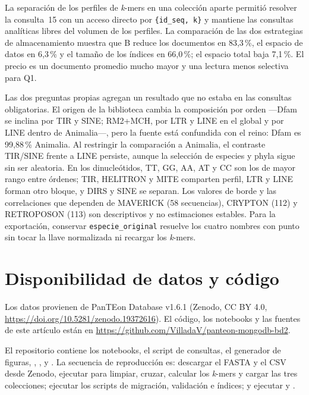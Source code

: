 \documentclass[journal]{IEEEtran}
\begin{document}
La separación de los perfiles de \textit{k}-mers en una colección aparte permitió resolver
la consulta~15 con un acceso directo por \texttt{\{id\_seq, k\}} y mantiene las consultas
analíticas libres del volumen de los perfiles. La comparación de las dos estrategias de
almacenamiento muestra que B reduce los documentos en 83,3\,\%, el espacio de datos en
6,3\,\% y el tamaño de los índices en 66,0\,\%; el espacio total baja 7,1\,\%. El precio es
un documento promedio mucho mayor y una lectura menos selectiva para Q1.

Las dos preguntas propias agregan un resultado que no estaba en las consultas obligatorias.
El origen de la biblioteca cambia la composición por orden ---Dfam se inclina por TIR y
SINE; RM2+MCH, por LTR y LINE en el global y por LINE dentro de Animalia---, pero la fuente
está confundida con el reino: Dfam es 99,88\,\% Animalia. Al restringir la comparación a
Animalia, el contraste TIR/SINE frente a LINE persiste, aunque la selección de especies y
phyla sigue sin ser aleatoria. En los dinucleótidos, TT, GG, AA, AT y CC son los de mayor
rango entre órdenes; TIR, HELITRON y MITE comparten perfil, LTR y LINE forman otro bloque, y
DIRS y SINE se separan. Los valores de borde y las correlaciones que dependen de MAVERICK
(58 secuencias), CRYPTON (112) y RETROPOSON (113) son descriptivos y no estimaciones
estables. Para la exportación, conservar \texttt{especie\_original} resuelve los cuatro nombres
con punto sin tocar la llave normalizada ni recargar los \textit{k}-mers.

\section*{Disponibilidad de datos y código}
Los datos provienen de PanTEon Database v1.6.1 (Zenodo, CC BY 4.0,
\url{https://doi.org/10.5281/zenodo.19372616}). El código, los notebooks y las fuentes de
este artículo están en \url{https://github.com/VilladaV/panteon-mongodb-bd2}.

El repositorio contiene los notebooks, el script de consultas, el generador de figuras,
, ,
 y . La secuencia
de reproducción es: descargar el FASTA y el CSV desde Zenodo, ejecutar
 para limpiar,
cruzar, calcular los \textit{k}-mers y cargar las tres colecciones; ejecutar los scripts de
migración, validación e índices; y ejecutar
 y
.
\end{document}
